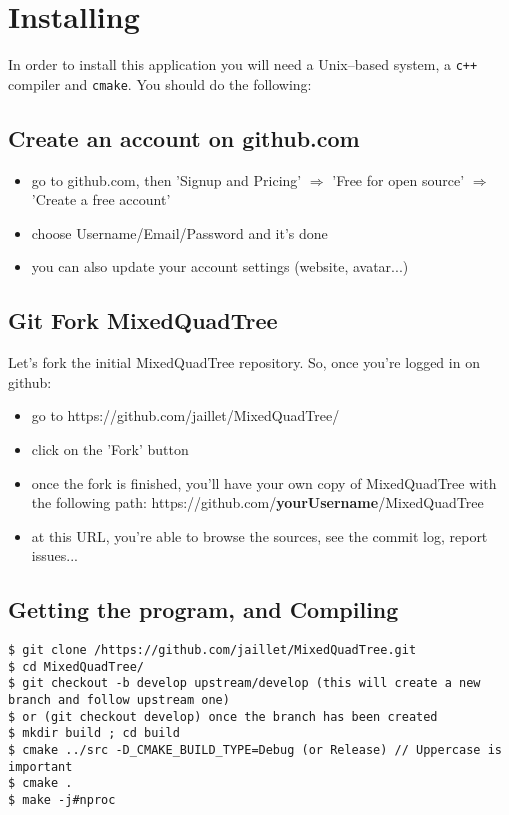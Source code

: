 \documentclass[10pt]{article}
\begin{document}
\section{Installing}
\label{install}

In order to install this application you will need a Unix--based system, a \texttt{c++} compiler and \texttt{cmake}. You should do the following:

\subsection{Create an account on github.com}

\begin{itemize}
\item go to github.com, then 'Signup and Pricing' $\Rightarrow$ 'Free for open source' $\Rightarrow$ 'Create a free account'
\item choose Username/Email/Password and it's done
\item you can also update your account settings (website, avatar...)
\end {itemize}

\subsection{Git Fork MixedQuadTree}

Let's fork the initial MixedQuadTree repository. So, once you're logged in on github:
\begin{itemize}
\item go to https://github.com/jaillet/MixedQuadTree/
\item click on the 'Fork' button
\item once the fork is finished, you'll have your own copy of MixedQuadTree with the following path: https://github.com/\textbf{yourUsername}/MixedQuadTree
\item at this URL, you're able to browse the sources, see the commit log, report issues...
\end {itemize}

\subsection{Getting the program, and Compiling}

\begin{tcolorbox}{\small
\begin{verbatim}
$ git clone /https://github.com/jaillet/MixedQuadTree.git
$ cd MixedQuadTree/
$ git checkout -b develop upstream/develop (this will create a new branch and follow upstream one)
$ or (git checkout develop) once the branch has been created
$ mkdir build ; cd build
$ cmake ../src -D_CMAKE_BUILD_TYPE=Debug (or Release) // Uppercase is important
$ cmake .
$ make -j#nproc
\end{verbatim}
}\end{tcolorbox}
\end{document}
